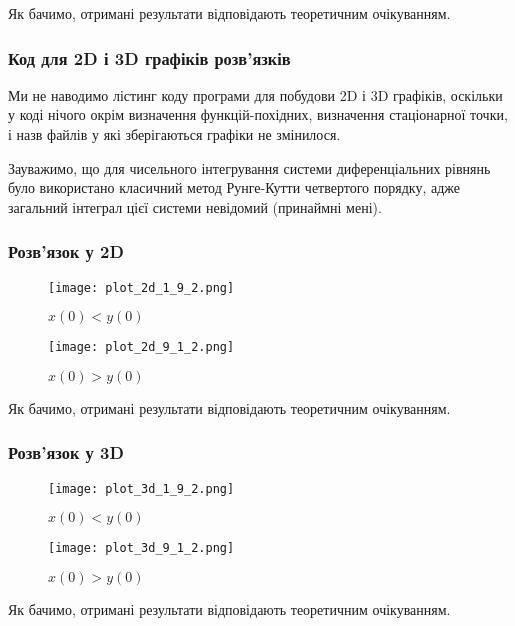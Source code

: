 Як бачимо, отримані результати відповідають теоретичним очікуванням.

\subsubsection{Код для 2D і 3D графіків розв'язків}

Ми не наводимо лістинг коду програми для побудови 2D і 3D графіків, оскільки у коді нічого окрім визначення функцій-похідних, визначення стаціонарної точки, і назв файлів у які зберігаються графіки не змінилося. \medskip

Зауважимо, що для чисельного інтегрування системи диференціальних рівнянь було використано класичний метод Рунге-Кутти четвертого порядку, адже загальний інтеграл цієї системи невідомий (принаймні мені). 

\subsubsection{Розв'язок у 2D}

\begin{figure}[H]
	\centering
	\caption{$x(0) < y(0)$}
	\texttt{[image: plot\_2d\_1\_9\_2.png]}
\end{figure}

\begin{figure}[H]
	\centering
	\caption{$x(0) > y(0)$}
	\texttt{[image: plot\_2d\_9\_1\_2.png]}
\end{figure}

Як бачимо, отримані результати відповідають теоретичним очікуванням.

\newpage
	
\subsubsection{Розв'язок у 3D}

\begin{minipage}[t]{.5\textwidth}
\begin{figure}[H]
	\centering
	\caption{$x(0) < y(0)$}
	\texttt{[image: plot\_3d\_1\_9\_2.png]}
\end{figure}
\end{minipage}
\begin{minipage}[t]{.5\textwidth}
\begin{figure}[H]
	\centering
	\caption{$x(0) > y(0)$}
	\texttt{[image: plot\_3d\_9\_1\_2.png]}
\end{figure}
\end{minipage}

Як бачимо, отримані результати відповідають теоретичним очікуванням.

